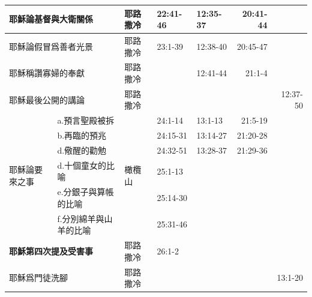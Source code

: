 \begin{table}[htbp]
\begin{tabular}{|p{4.57em}l|p{4.43em}|p{4.215em}|p{4.355em}|r|r|}
    \midrule
    \multicolumn{2}{|p{17.285em}|}{耶穌論基督與大衛關係} & 耶路撒冷  & 22:41-46 & 12:35-37 & \multicolumn{1}{p{5.145em}|}{20:41-44} &  \\
    \midrule
    \multicolumn{2}{|p{17.285em}|}{耶穌論假冒爲善者光景} & 耶路撒冷  & 23:1-39 & 12:38-40 & \multicolumn{1}{p{5.145em}|}{20:45-47} &  \\
    \midrule
    \multicolumn{2}{|p{17.285em}|}{耶穌稱讚寡婦的奉獻} & 耶路撒冷  & \multicolumn{1}{r|}{} & 12:41-44 & \multicolumn{1}{p{5.145em}|}{21:1-4} &  \\
    \midrule
    \multicolumn{2}{|p{17.285em}|}{耶穌最後公開的講論} & 耶路撒冷  & \multicolumn{1}{r|}{} & \multicolumn{1}{r|}{} &       & \multicolumn{1}{p{5.93em}|}{12:37-50} \\
    \midrule
    \multicolumn{1}{|l|}{\multirow{6}{*}{\parbox{0.08\textwidth}{耶穌論要來之事}}}  & \multicolumn{1}{p{12.715em}|}{a.預言聖殿被拆} & \multirow{6}[12]{*}{橄欖山} & 24:1-14 & 13:1-13 & \multicolumn{1}{p{5.145em}|}{21:5-19} &  \\
\cmidrule{2-2}\cmidrule{4-7}    \multicolumn{1}{|l|}{} & \multicolumn{1}{p{12.715em}|}{b.再臨的預兆} & \multicolumn{1}{c|}{} & 24:15-31 & 13:14-27 & \multicolumn{1}{p{5.145em}|}{21:20-28} &  \\
\cmidrule{2-2}\cmidrule{4-7}    \multicolumn{1}{|l|}{} & \multicolumn{1}{p{12.715em}|}{d.儆醒的勸勉} & \multicolumn{1}{c|}{} & 24:32-51 & 13:28-37 & \multicolumn{1}{p{5.145em}|}{21:29-36} &  \\
\cmidrule{2-2}\cmidrule{4-7}    \multicolumn{1}{|l|}{} & \multicolumn{1}{p{12.715em}|}{d.十個童女的比喻} & \multicolumn{1}{c|}{} & 25:1-13 & \multicolumn{1}{r|}{} &       &  \\
\cmidrule{2-2}\cmidrule{4-7}    \multicolumn{1}{|l|}{} & \multicolumn{1}{p{12.715em}|}{e.分銀子與算帳的比喻} & \multicolumn{1}{c|}{} & 25:14-30 & \multicolumn{1}{r|}{} &       &  \\
\cmidrule{2-2}\cmidrule{4-7}    \multicolumn{1}{|l|}{} & \multicolumn{1}{p{12.715em}|}{f.分別綿羊與山羊的比喻} & \multicolumn{1}{c|}{} & 25:31-46 & \multicolumn{1}{r|}{} &       &  \\
    \midrule
    \multicolumn{2}{|p{17.285em}|}{\textbf{耶穌第四次提及受害事}} & 耶路撒冷  & 26:1-2 & \multicolumn{1}{r|}{} &       &  \\
    \midrule
    \multicolumn{2}{|p{17.285em}|}{耶穌爲門徒洗腳} & 耶路撒冷  & \multicolumn{1}{r|}{} & \multicolumn{1}{r|}{} &       & \multicolumn{1}{p{5.93em}|}{13:1-20} \\

\end{tabular}
\end{table}
